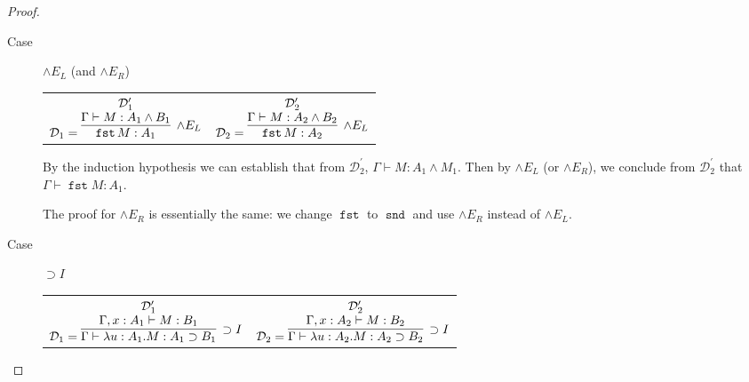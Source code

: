 \documentclass[11pt,letterpaper]{article}
\DeclareMathOperator{\fst}{\mathtt{fst}}
\DeclareMathOperator{\snd}{\mathtt{snd}}
\newcommand{\D}{\mathcal{D}}
\newcommand{\proves}{\vdash}
\renewcommand{\implies}{\supset}
\begin{document}
\begin{proof}
\begin{description}
        \item[Case] $\land E_L$ (and $\land E_R$)

            \begin{center}
                \begin{tabular}{cc}
                    $
                    \mathcal{D}_1 = \infer[\land E_L]{\fst M : A_1}{
                        \deduce[\mathcal{D}_1^\prime]{
                            \Gamma \proves M : A_1 \land B_1
                        }{}
                    }
                    $
                    &
                    $
                    \mathcal{D}_2 = \infer[\land E_L]{\fst M : A_2}{
                        \deduce[\mathcal{D}_2^\prime]{
                            \Gamma \proves M : A_2 \land B_2
                        }{}
                    }
                    $
                \end{tabular}
            \end{center}

            By the induction hypothesis we can establish that from
            $\D_2^\prime$, $\Gamma \proves M : A_1 \land M_1$. Then by $\land
            E_L$ (or $\land E_R$), we conclude from $\D_2^\prime$ that
            $\Gamma \proves \fst M : A_1$.

            The proof for $\land E_R$ is essentially the same: we change $\fst$
            to $\snd$ and use $\land E_R$ instead of $\land E_L$.

        \item[Case] $\implies I$

            \begin{center}
                \begin{tabular}{cc}
                    $
                    \mathcal{D}_1 = \infer[\implies I]{
                        \Gamma \proves \lambda u : A_1 . M : A_1 \implies B_1
                    }{
                        \deduce[\mathcal{D}_1^\prime]{
                            \Gamma, x:A_1 \proves M : B_1
                        }{}
                    }
                    $
                    &
                    $
                    \mathcal{D}_2 = \infer[\implies I]{
                        \Gamma \proves \lambda u : A_2 . M : A_2 \implies B_2
                    }{
                        \deduce[\mathcal{D}_2^\prime]{
                            \Gamma, x:A_2 \proves M : B_2
                        }{}
                    }
                    $
                \end{tabular}
            \end{center}


\end{description}
\end{proof}
\end{document}
